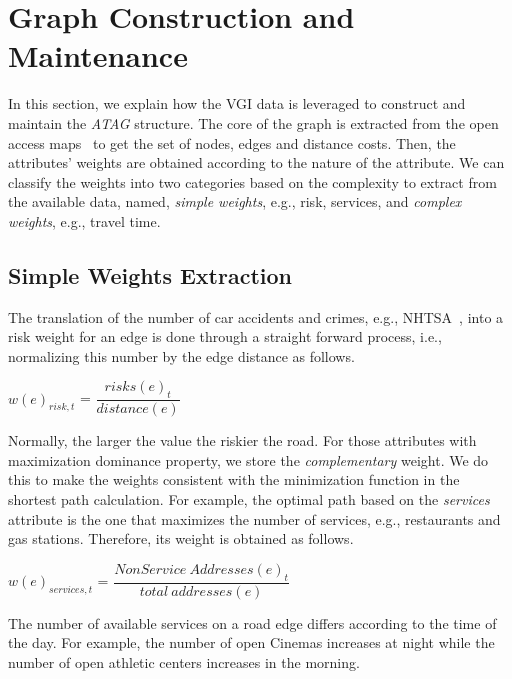 
\section{Graph Construction and Maintenance}
\label{sect:constructionModule}
In this section, we explain how the VGI data is leveraged to construct and maintain the {\em ATAG} structure.
The core of the graph is extracted from the open access maps~\cite{AEA+14} to get the set of nodes, edges and distance costs.
Then, the attributes' weights are obtained according to the nature of the attribute. We can classify the weights into two categories based on the complexity to extract from the available data, named, {\em simple weights}, e.g., risk, services, and {\em complex weights}, e.g., travel time.




\subsection{Simple Weights Extraction}
The translation of the number of car accidents and crimes, e.g., NHTSA~\cite{NHT+13}, into a risk weight for an edge is done through a straight forward process, i.e., normalizing this number by the edge distance as follows.
 \begin{center}
$w(e)_{risk,t}$ = $\dfrac{risks(e)_t}{distance(e)}$
\end{center}
%
%
Normally, the larger the value the riskier the road.
%
For those attributes with maximization dominance property, we store the {\em complementary} weight. We do this to make the weights consistent with the minimization function in the shortest path calculation. For example, the optimal path based on the {\em services} attribute is the one that maximizes the number of services, e.g., restaurants and gas stations. Therefore, its weight is obtained as follows.
\begin{center}
$w(e)_{services,t}$ = $\dfrac{NonService~Addresses(e)_t}{total~addresses(e)}$
\end{center}
%
The number of available services on a road edge differs according to the time of the day. For example, the number of open Cinemas increases at night while the number of open athletic centers increases in the morning.
%

